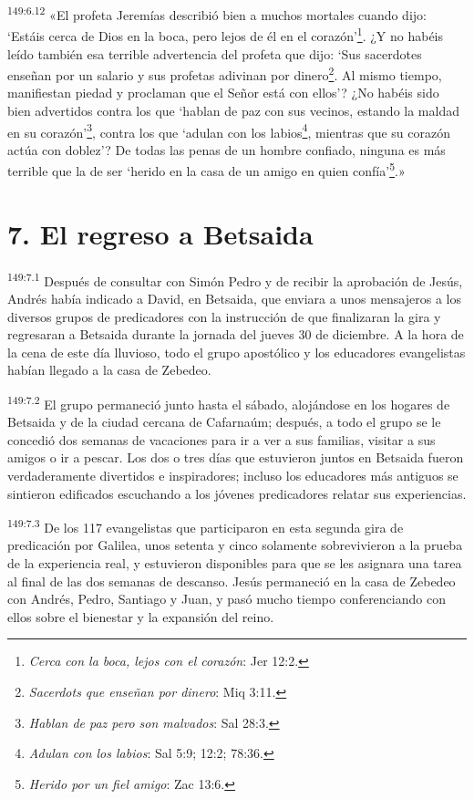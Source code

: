 \par
\textsuperscript{149:6.12} «El profeta Jeremías describió bien a muchos mortales cuando dijo: `Estáis cerca de Dios en la boca, pero lejos de él en el corazón'\footnote{\textit{Cerca con la boca, lejos con el corazón}: Jer 12:2.}. ¿Y no habéis leído también esa terrible advertencia del profeta que dijo: `Sus sacerdotes enseñan por un salario y sus profetas adivinan por dinero\footnote{\textit{Sacerdots que enseñan por dinero}: Miq 3:11.}. Al mismo tiempo, manifiestan piedad y proclaman que el Señor está con ellos'? ¿No habéis sido bien advertidos contra los que `hablan de paz con sus vecinos, estando la maldad en su corazón'\footnote{\textit{Hablan de paz pero son malvados}: Sal 28:3.}, contra los que `adulan con los labios\footnote{\textit{Adulan con los labios}: Sal 5:9; 12:2; 78:36.}, mientras que su corazón actúa con doblez'? De todas las penas de un hombre confiado, ninguna es más terrible que la de ser `herido en la casa de un amigo en quien confía'\footnote{\textit{Herido por un fiel amigo}: Zac 13:6.}.»

\section*{7. El regreso a Betsaida}
\par
\textsuperscript{149:7.1} Después de consultar con Simón Pedro y de recibir la aprobación de Jesús, Andrés había indicado a David, en Betsaida, que enviara a unos mensajeros a los diversos grupos de predicadores con la instrucción de que finalizaran la gira y regresaran a Betsaida durante la jornada del jueves 30 de diciembre. A la hora de la cena de este día lluvioso, todo el grupo apostólico y los educadores evangelistas habían llegado a la casa de Zebedeo.

\par
\textsuperscript{149:7.2} El grupo permaneció junto hasta el sábado, alojándose en los hogares de Betsaida y de la ciudad cercana de Cafarnaúm; después, a todo el grupo se le concedió dos semanas de vacaciones para ir a ver a sus familias, visitar a sus amigos o ir a pescar. Los dos o tres días que estuvieron juntos en Betsaida fueron verdaderamente divertidos e inspiradores; incluso los educadores más antiguos se sintieron edificados escuchando a los jóvenes predicadores relatar sus experiencias.

\par
\textsuperscript{149:7.3} De los 117 evangelistas que participaron en esta segunda gira de predicación por Galilea, unos setenta y cinco solamente sobrevivieron a la prueba de la experiencia real, y estuvieron disponibles para que se les asignara una tarea al final de las dos semanas de descanso. Jesús permaneció en la casa de Zebedeo con Andrés, Pedro, Santiago y Juan, y pasó mucho tiempo conferenciando con ellos sobre el bienestar y la expansión del reino.